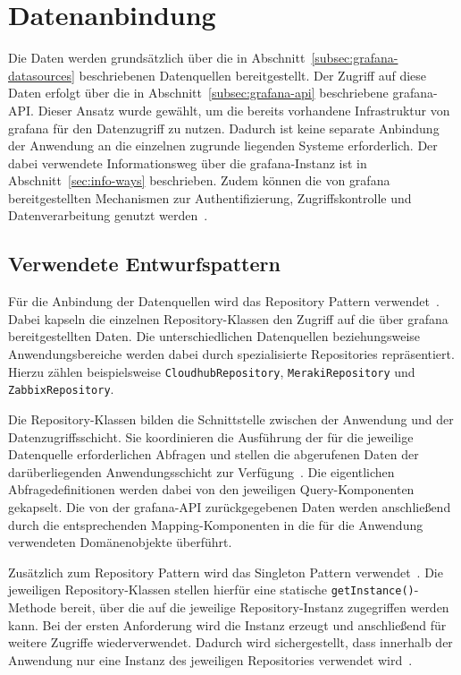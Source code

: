 \section{Datenanbindung}
\label{sec:data-loading}

Die Daten werden grundsätzlich über die in Abschnitt~\ref{subsec:grafana-datasources} beschriebenen 
Datenquellen bereitgestellt. Der Zugriff auf diese Daten erfolgt über die in Abschnitt~\ref{subsec:grafana-api} 
beschriebene \gls{grafana}-API. Dieser Ansatz wurde gewählt, um die bereits vorhandene Infrastruktur von 
\gls{grafana} für den Datenzugriff zu nutzen. Dadurch ist keine separate Anbindung der Anwendung an die 
einzelnen zugrunde liegenden Systeme erforderlich. Der dabei verwendete Informationsweg über die 
\gls{grafana}-Instanz ist in Abschnitt~\ref{sec:info-ways} beschrieben. Zudem können die von \gls{grafana} 
bereitgestellten Mechanismen zur Authentifizierung, Zugriffskontrolle und Datenverarbeitung genutzt 
werden~\cite{VBondar2025,grafana2026datasources,grafana2026httpapi}.

\subsection{Verwendete Entwurfspattern}
\label{subsec:used-databinding-patterns}

Für die Anbindung der Datenquellen wird das Repository Pattern verwendet~\cite{fowler2026repository}. 
Dabei kapseln die einzelnen Repository-Klassen den Zugriff auf die über \gls{grafana} bereitgestellten 
Daten. Die unterschiedlichen Datenquellen beziehungsweise Anwendungsbereiche werden dabei durch spezialisierte 
Repositories repräsentiert. Hierzu zählen beispielsweise \texttt{CloudhubRepository}, \texttt{MerakiRepository} und \texttt{ZabbixRepository}.

Die Repository-Klassen bilden die Schnittstelle zwischen der Anwendung und der Datenzugriffsschicht. 
Sie koordinieren die Ausführung der für die jeweilige Datenquelle erforderlichen Abfragen und stellen 
die abgerufenen Daten der darüberliegenden Anwendungsschicht zur Verfügung~\cite{fowler2026repository}. 
Die eigentlichen Abfragedefinitionen werden dabei von den jeweiligen Query-Komponenten gekapselt. Die 
von der \gls{grafana}-API zurückgegebenen Daten werden anschließend durch die entsprechenden Mapping-Komponenten 
in die für die Anwendung verwendeten Domänenobjekte überführt.

Zusätzlich zum Repository Pattern wird das Singleton Pattern verwendet~\cite{Gamma1994}. Die jeweiligen 
Repository-Klassen stellen hierfür eine statische \texttt{getInstance()}-Methode bereit, über die auf 
die jeweilige Repository-Instanz zugegriffen werden kann. Bei der ersten Anforderung wird die Instanz 
erzeugt und anschließend für weitere Zugriffe wiederverwendet. Dadurch wird sichergestellt, dass innerhalb 
der Anwendung nur eine Instanz des jeweiligen Repositories verwendet wird~\cite{Gamma1994}.

